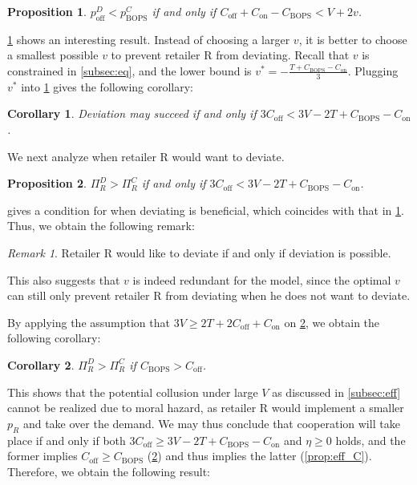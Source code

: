 \documentclass[a4paper]{article}
\theoremstyle{definition}
\theoremstyle{plain}
\newtheorem{proposition}{Proposition}
\newtheorem{corollary}{Corollary}
\theoremstyle{remark}
\newtheorem*{remark}{Remark}
\newcommand{\on}{\mathrm{on}}
\newcommand{\off}{\mathrm{off}}
\newcommand{\BOPS}{\mathrm{BOPS}}
\begin{document}
\begin{proposition}\label{prop:dev_v}
    $p_{\off}^D<p_{\BOPS}^C$ if and only if $C_{\off}+C_{\on}-C_{\BOPS}<V+2v$.
\end{proposition}

\cref{prop:dev_v} shows an interesting result.
Instead of choosing a larger $v$,
it is better to choose a smallest possible $v$ to prevent retailer R from deviating.
Recall that $v$ is constrained in \cref{subsec:eq},
and the lower bound is $v^*=-\tfrac{T+C_{\BOPS}-C_{\on}}{3}$.
Plugging $v^*$ into \cref{prop:dev_v} gives the following corollary:

\begin{corollary}
    Deviation may succeed if and only if $3C_{\off}<3V-2T+C_{\BOPS}-C_{\on}$.
\end{corollary}

We next analyze when retailer R would want to deviate.

\begin{proposition}\label{prop:dev_pi}
    $\Pi_R^D>\Pi_R^C$ if and only if $3C_{\off}<3V-2T+C_{\BOPS}-C_{\on}$.
\end{proposition}

 gives a condition for when deviating is beneficial,
which coincides with that in \cref{prop:dev_v}.
Thus,
we obtain the following remark:

\begin{remark}
    Retailer R would like to deviate if and only if deviation is possible.
\end{remark}

This also suggests that $v$ is indeed redundant for the model,
since the optimal $v$ can still only prevent retailer R from deviating when he does not want to deviate.

By applying the assumption that $3V\geq 2T+2C_{\off}+C_{\on}$ on \cref{prop:dev_pi},
we obtain the following corollary:

\begin{corollary}\label{cor:dev_C}
    $\Pi_R^D>\Pi_R^C$ if $C_{\BOPS}>C_{\off}$.
\end{corollary}

This shows that the potential collusion under large $V$ as discussed in \cref{subsec:eff} cannot be realized due to moral hazard,
as retailer R would implement a smaller $p_R$ and take over the demand.
We may thus conclude that cooperation will take place if and only if both $3C_{\off}\geq 3V-2T+C_{\BOPS}-C_{\on}$ and $\eta\geq 0$ holds,
and the former implies $C_{\off}\geq C_{\BOPS}$ (\cref{cor:dev_C}) and thus implies the latter (\cref{prop:eff_C}).
Therefore,
we obtain the following result:
\end{document}
